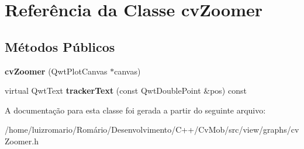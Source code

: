 \hypertarget{classcvZoomer}{
\section{Referência da Classe cvZoomer}
\label{classcvZoomer}
}
\subsection*{Métodos Públicos}
\begin{DoxyCompactItemize}
\item 
\hypertarget{classcvZoomer_a2673d92b597dda1d7d0f79ac13928143}{
{\bfseries cvZoomer} (QwtPlotCanvas $\ast$canvas)}
\label{classcvZoomer_a2673d92b597dda1d7d0f79ac13928143}

\item 
\hypertarget{classcvZoomer_a111b7945c477ed74552405acff9e715f}{
virtual QwtText {\bfseries trackerText} (const QwtDoublePoint \&pos) const }
\label{classcvZoomer_a111b7945c477ed74552405acff9e715f}

\end{DoxyCompactItemize}


A documentação para esta classe foi gerada a partir do seguinte arquivo:\begin{DoxyCompactItemize}
\item 
/home/luizromario/Romário/Desenvolvimento/C++/CvMob/src/view/graphs/cvZoomer.h\end{DoxyCompactItemize}
